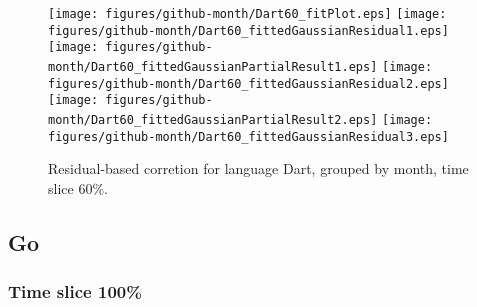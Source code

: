 \begin{figure}[hb]
\centering
{}
{\texttt{[image: figures/github-month/Dart60\_fitPlot.eps]}}
{\texttt{[image: figures/github-month/Dart60\_fittedGaussianResidual1.eps]}}
{\texttt{[image: figures/github-month/Dart60\_fittedGaussianPartialResult1.eps]}}
{\texttt{[image: figures/github-month/Dart60\_fittedGaussianResidual2.eps]}}
{\texttt{[image: figures/github-month/Dart60\_fittedGaussianPartialResult2.eps]}}
{\texttt{[image: figures/github-month/Dart60\_fittedGaussianResidual3.eps]}}
\caption{Residual-based corretion for language Dart, grouped by month, time slice 60\%.}
\end{figure}


\clearpage 
\newpage 


\subsection{Go}

\FloatBarrier

\subsubsection{Time slice 100\%}

